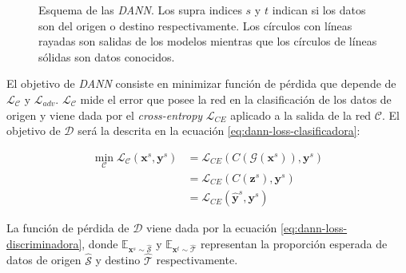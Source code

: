 \begin{figure}[H]

  \caption[Esquema de {\it DANN}]{Esquema de las {\it DANN}. Los supra indices $s$ y $t$ indican si los datos son del origen o destino respectivamente.
    Los círculos con líneas rayadas son salidas de los modelos mientras que los círculos de líneas sólidas son datos conocidos.}
  \label{fig:dann-esquema}
\end{figure}

El objetivo de {\it DANN} consiste en minimizar función de pérdida que depende de $\mathcal{L}_\mathcal{C}$ y
$\mathcal{L}_{adv}$. $\mathcal{L}_\mathcal{C}$ mide el error que posee la red en la clasificación de los datos de
origen y viene dada por el {\it cross-entropy} $\mathcal{L}_{CE}$ aplicado a la salida de la red $\mathcal{C}$. El
objetivo de $\mathcal{D}$ será la descrita en la ecuación \ref{eq:dann-loss-clasificadora}:

\begin{align}
  \min_{\mathcal{C}} \mathcal{L}_\mathcal{C}(\mathbf{x}^s, \mathbf{y}^s) & = \mathcal{L}_{CE}(C(\mathcal{G}(\mathbf{x}^s)), \mathbf{y}^s) \nonumber \\
                                                                         & = \mathcal{L}_{CE}(C(\mathbf{z}^s), \mathbf{y}^s) \nonumber              \\
                                                                         & = \mathcal{L}_{CE}(\hat{\mathbf{y}}^s, \mathbf{y}^s)
  \label{eq:dann-loss-clasificadora}
\end{align}

La función de pérdida de $\mathcal{D}$ viene dada por la ecuación \ref{eq:dann-loss-discriminadora}, donde
$\mathbb{E}_{\mathbf{x}^s \sim \mathcal{\hat{S}}}$ y $\mathbb{E}_{\mathbf{x}^t \sim \mathcal{\hat{T}}}$ representan la
proporción esperada de datos de origen $\mathcal{\hat{S}}$ y destino $\mathcal{\hat{T}}$ respectivamente.

